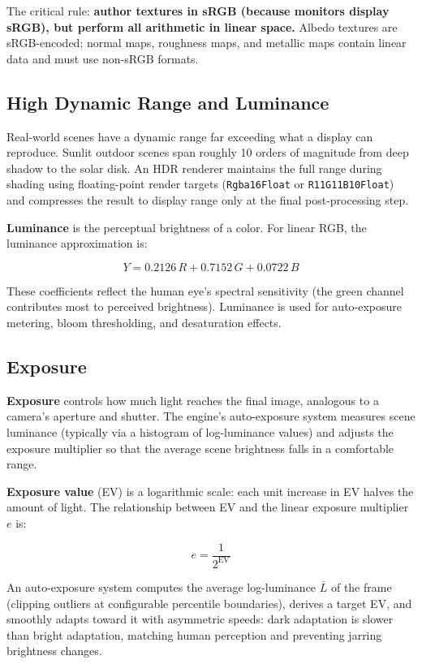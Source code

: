 \documentclass[
  11pt,
  letterpaper,
  DIV=11,
  numbers=noendperiod,
  twoside,
  open=right]{scrreprt}
\begin{document}
The critical rule: \textbf{author textures in sRGB (because monitors
display sRGB), but perform all arithmetic in linear space.} Albedo
textures are sRGB-encoded; normal maps, roughness maps, and metallic
maps contain linear data and must use non-sRGB formats.

\subsection{High Dynamic Range and
Luminance}\label{high-dynamic-range-and-luminance}

Real-world scenes have a dynamic range far exceeding what a display can
reproduce. Sunlit outdoor scenes span roughly 10 orders of magnitude
from deep shadow to the solar disk. An HDR renderer maintains the full
range during shading using floating-point render targets
(\texttt{Rgba16Float} or \texttt{R11G11B10Float}) and compresses the
result to display range only at the final post-processing step.

\textbf{Luminance} is the perceptual brightness of a color. For linear
RGB, the luminance approximation is:

\[
Y = 0.2126 \, R + 0.7152 \, G + 0.0722 \, B
\]

These coefficients reflect the human eye's spectral sensitivity (the
green channel contributes most to perceived brightness). Luminance is
used for auto-exposure metering, bloom thresholding, and desaturation
effects.

\subsection{Exposure}\label{exposure}

\textbf{Exposure} controls how much light reaches the final image,
analogous to a camera's aperture and shutter. The engine's auto-exposure
system measures scene luminance (typically via a histogram of
log-luminance values) and adjusts the exposure multiplier so that the
average scene brightness falls in a comfortable range.

\textbf{Exposure value} (EV) is a logarithmic scale: each unit increase
in EV halves the amount of light. The relationship between EV and the
linear exposure multiplier \(e\) is:

\[
e = \frac{1}{2^{\text{EV}}}
\]

An auto-exposure system computes the average log-luminance \(\bar{L}\)
of the frame (clipping outliers at configurable percentile boundaries),
derives a target EV, and smoothly adapts toward it with asymmetric
speeds: dark adaptation is slower than bright adaptation, matching human
perception and preventing jarring brightness changes.
\end{document}
